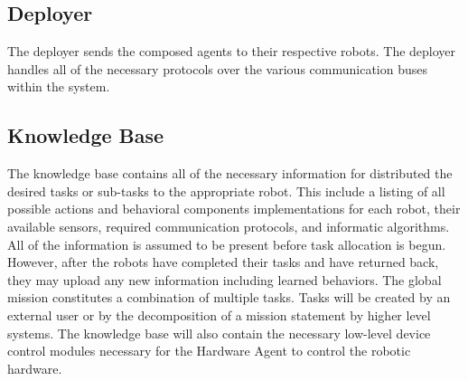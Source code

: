     \subsection{Deployer}
      The deployer sends the composed agents to their respective robots.
      The deployer handles all of the necessary protocols over the
        various communication buses within the system.

    \subsection{Knowledge Base}
      The knowledge base contains all of the necessary information for
        distributed the desired tasks or sub-tasks to the appropriate robot.
      This include a listing of all possible actions and behavioral components 
        implementations for each robot, their available sensors, required 
        communication protocols, and informatic algorithms.
      All of the information is assumed to be present before task allocation 
        is begun.
      However, after the robots have completed their tasks and have returned 
        back, they may upload any new information including learned behaviors.
      The global mission constitutes a combination of multiple tasks.
      Tasks will be created by an external user or by the decomposition of a 
        mission statement by higher level systems.
      The knowledge base will also contain the necessary low-level 
        device control modules necessary for the Hardware Agent to control the 
        robotic hardware.
